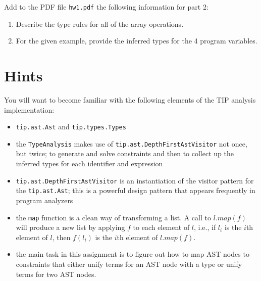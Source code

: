 \documentclass[12pt,letterpaper]{article}
\begin{document}
Add to the PDF file \texttt{hw1.pdf} the following information for part 2: 
\begin{enumerate}
\item Describe the type rules for all of the array operations.
\item For the given example, provide the inferred types for the 4 program variables.
\end{enumerate}

\section*{Hints}
You will want to become familiar with the following elements of the TIP analysis implementation:
\begin{itemize}
\item \texttt{tip.ast.Ast} and \texttt{tip.types.Types}
\item the \texttt{TypeAnalysis} makes use of \texttt{tip.ast.DepthFirstAstVisitor} not once, but twice; to generate and solve constraints and then to collect up the inferred types for each identifier and expression
\item \texttt{tip.ast.DepthFirstAstVisitor} is an instantiation of the visitor pattern for the \texttt{tip.ast.Ast}; this is a powerful design pattern that appears frequently in program analyzers
\item the \texttt{map} function is a clean way of transforming a list.  A call to $l.map(f)$ will produce a new list by applying $f$ to each element of $l$, i.e., if $l_i$ is the $i$th element of $l$, then $f(l_i)$ is the $i$th element of $l.map(f)$.
\item the main task in this assignment is to figure out how to map AST nodes to constraints that either unify terms for an AST node with a type or unify terms for two AST nodes.
\end{itemize}
\end{document}
